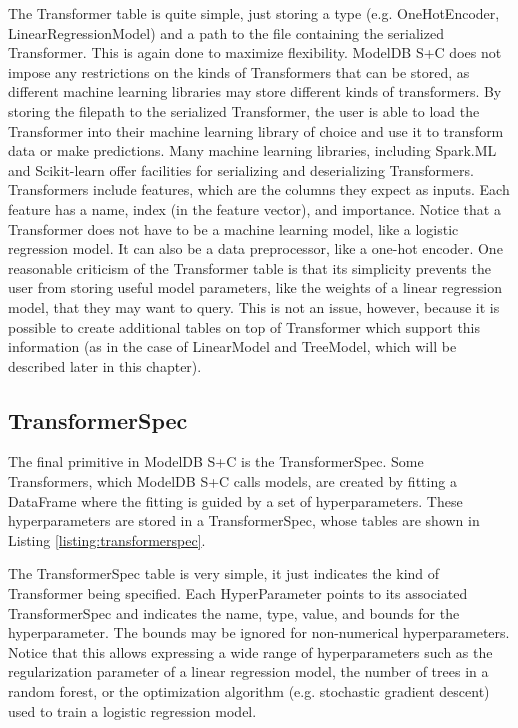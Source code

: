 The Transformer table is quite simple, just storing a type (e.g. OneHotEncoder,
LinearRegressionModel) and a path to the file containing the serialized Transformer.
This is again done to maximize flexibility. ModelDB S+C does not impose any restrictions
on the kinds of Transformers that can be stored, as different machine learning libraries
may store different kinds of transformers. By storing the filepath to the serialized Transformer,
the user is able to load the Transformer into their machine learning library of choice and use
it to transform data or make predictions. Many machine learning libraries, including Spark.ML and Scikit-learn offer
facilities for serializing and deserializing Transformers. Transformers include features, which are the
columns they expect as inputs. Each feature has a name, index (in the feature vector), and importance. 
Notice that a Transformer does not have to be a machine learning model, like a logistic regression model. 
It can also be a data preprocessor, like
a one-hot encoder. One reasonable criticism of the Transformer table is that its simplicity 
prevents the user from storing useful model parameters, like the weights of a linear regression model,
that they may want to query. This is not an issue, however, because it is possible to create
additional tables on top of Transformer which support this information (as in the case of LinearModel
and TreeModel, which will be described later in this chapter).

\subsection{TransformerSpec}
The final primitive in ModelDB S+C is the TransformerSpec. Some Transformers, which
ModelDB S+C calls models, are created by fitting a DataFrame where the fitting is 
guided by a set of hyperparameters. These hyperparameters are stored in a 
TransformerSpec, whose tables are shown in Listing \ref{listing:transformerspec}.

The TransformerSpec table is very simple, it just indicates the kind of Transformer
being specified. Each HyperParameter points to its associated TransformerSpec and indicates
the name, type, value, and bounds for the hyperparameter. The bounds may be ignored
for non-numerical hyperparameters. Notice that this allows expressing a wide range
of hyperparameters such as the regularization parameter of a linear regression model, 
the number of trees in a random forest, or the optimization algorithm (e.g. stochastic 
gradient descent) used to train a logistic regression model.

